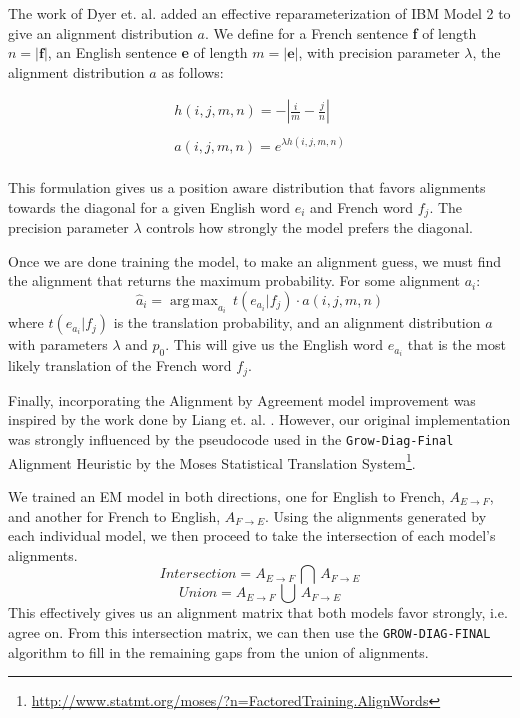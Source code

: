 \documentclass[twoside,twocolumn]{article}
\DeclareMathOperator*{\argmax}{arg\,max}
\begin{document}
The work of Dyer et. al. \cite{dyer2013simple} added an effective reparameterization of IBM Model 2 to give an alignment distribution $a$. We define for a French sentence \textbf{f} of length $n = |\textbf{f}|$, an English sentence \textbf{e} of length $m=|\textbf{e}|$, with precision parameter $\lambda$, the alignment distribution $a$ as follows:

\begin{equation}
\begin{split}
h(i,j,m,n) = - \left| \frac{i}{m} - \frac{j}{n}\right| \\
\\
a(i,j,m,n) =e^{  \lambda h(i,j,m,n)} \\
\end{split}
\end{equation}

This formulation gives us a position aware distribution that favors alignments towards the diagonal for a given English word $e_i$ and French word $f_j$. The precision parameter $\lambda$ controls how strongly the model prefers the diagonal.

Once we are done training the model, to make an alignment guess, we must find the alignment that returns the maximum probability. For some alignment $a_i$:
\begin{equation}
\hat{a}_i = \argmax_{a_i} \, t(e_{a_i}|f_j) \cdot a(i, j, m, n)
\end{equation}
where $t(e_{a_i}|f_j)$ is the translation probability, and an alignment distribution $a$ with parameters $\lambda$ and $p_0$. This will give us the English word $e_{a_i}$ that is the most likely translation of the French word $f_j$.

Finally, incorporating the Alignment by Agreement model improvement was inspired by the work done by Liang et. al. \cite{liang2006alignment}. However, our original implementation was strongly influenced by the pseudocode used in the \texttt{Grow-Diag-Final} Alignment Heuristic by the Moses Statistical Translation System\footnote{\url{http://www.statmt.org/moses/?n=FactoredTraining.AlignWords}}.

We trained an EM model in both directions, one for English to French, $A_{E \rightarrow F}$, and another for French to English, $A_{F \rightarrow E}$. Using the alignments generated by each individual model, we then proceed to take the intersection of each model's alignments.
\begin{equation}
Intersection = A_{E \rightarrow F} \, \bigcap \, A_{F \rightarrow E}
\end{equation}
\begin{equation}
Union = A_{E \rightarrow F} \, \bigcup \, A_{F \rightarrow E}
\end{equation}
This effectively gives us an alignment matrix that both models favor strongly, i.e. agree on. From this intersection matrix, we can then use the \texttt{GROW-DIAG-FINAL} algorithm to fill in the remaining gaps from the union of alignments.
\end{document}
